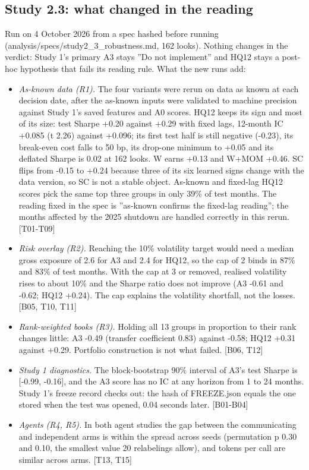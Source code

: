 \subsection*{Study 2.3: what changed in the reading}
Run on 4 October 2026 from a spec hashed before running (analysis/specs/study2\_3\_robustness.md, 162 looks). Nothing changes in the verdict: Study 1's primary A3 stays ''Do not implement'' and HQ12 stays a post-hoc hypothesis that fails its reading rule. What the new runs add:
\begin{itemize}
\item \emph{As-known data (R1).} The four variants were rerun on data as known at each decision date, after the as-known inputs were validated to machine precision against Study 1's saved features and A0 scores. HQ12 keeps its sign and most of its size: test Sharpe +0.20 against +0.29 with fixed lags, 12-month IC +0.085 (t 2.26) against +0.096; its first test half is still negative (-0.23), its break-even cost falls to 50 bp, its drop-one minimum to +0.05 and its deflated Sharpe is 0.02 at 162 looks. W earns +0.13 and W+MOM +0.46. SC flips from -0.15 to +0.24 because three of its six learned signs change with the data version, so SC is not a stable object. As-known and fixed-lag HQ12 scores pick the same top three groups in only 39\% of test months. The reading fixed in the spec is ''as-known confirms the fixed-lag reading''; the months affected by the 2025 shutdown are handled correctly in this rerun. [T01-T09]
\item \emph{Risk overlay (R2).} Reaching the 10\% volatility target would need a median gross exposure of 2.6 for A3 and 2.4 for HQ12, so the cap of 2 binds in 87\% and 83\% of test months. With the cap at 3 or removed, realised volatility rises to about 10\% and the Sharpe ratio does not improve (A3 -0.61 and -0.62; HQ12 +0.24). The cap explains the volatility shortfall, not the losses. [B05, T10, T11]
\item \emph{Rank-weighted books (R3).} Holding all 13 groups in proportion to their rank changes little: A3 -0.49 (transfer coefficient 0.83) against -0.58; HQ12 +0.31 against +0.29. Portfolio construction is not what failed. [B06, T12]
\item \emph{Study 1 diagnostics.} The block-bootstrap 90\% interval of A3's test Sharpe is [-0.99, -0.16], and the A3 score has no IC at any horizon from 1 to 24 months. Study 1's freeze record checks out: the hash of FREEZE.json equals the one stored when the test was opened, 0.04 seconds later. [B01-B04]
\item \emph{Agents (R4, R5).} In both agent studies the gap between the communicating and independent arms is within the spread across seeds (permutation p 0.30 and 0.10, the smallest value 20 relabelings allow), and tokens per call are similar across arms. [T13, T15]

\end{itemize}
